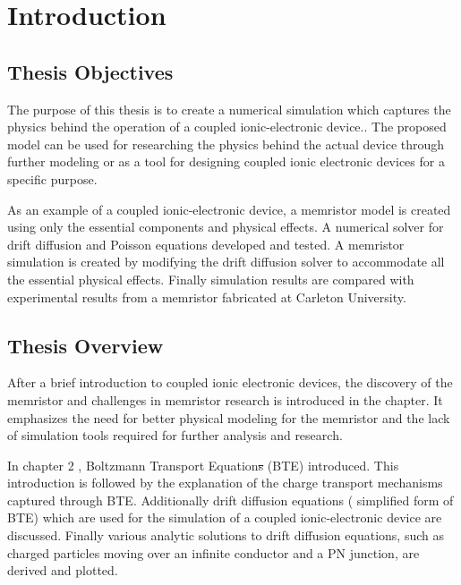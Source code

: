 
\chapter{Introduction} %


\label{Chapter1} %


\section{Thesis Objectives}
\begin{doublespace}
The purpose of this thesis is to create a numerical simulation which captures the physics behind the operation of a coupled ionic-electronic device.. The proposed model can be used for researching the physics behind the actual device through further modeling or as a tool for designing coupled ionic electronic devices for a specific purpose. 

As an example of a coupled ionic-electronic device, a memristor model is created using only the essential components and physical effects. A numerical solver for  drift diffusion and Poisson equations  developed and tested. A memristor simulation is created by modifying the drift diffusion solver to accommodate all the essential physical effects. Finally simulation results are compared with experimental results from a memristor fabricated at Carleton University.

\section{Thesis Overview}

After a brief introduction to coupled ionic electronic devices, the discovery of the memristor and challenges in memristor research is introduced in the  chapter. It emphasizes the need for better physical modeling for the memristor and the lack of simulation tools required for further analysis and research.

In chapter 2 ,  Boltzmann Transport Equation\sout{s} (BTE)  introduced. This introduction is followed by the explanation of the charge transport mechanisms captured through  BTE. Additionally drift diffusion equations ( simplified form of BTE) which are used for the simulation of a coupled ionic-electronic device are discussed. Finally various analytic solutions to drift diffusion equations, such as charged particles moving over an infinite conductor and a PN junction, are derived and plotted. 


\end{doublespace}
